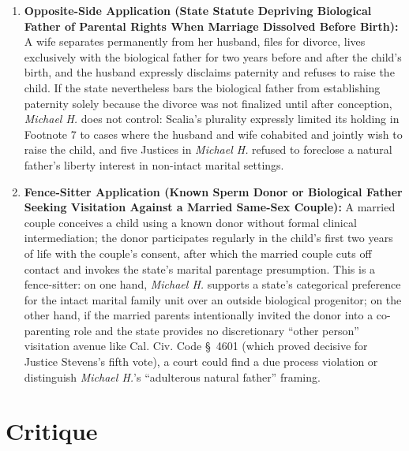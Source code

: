 \documentclass[12pt]{article}
\begin{document}
\begin{enumerate}
\item \textbf{Opposite-Side Application (State Statute Depriving Biological Father of Parental Rights When Marriage Dissolved Before Birth):} A wife separates permanently from her husband, files for divorce, lives exclusively with the biological father for two years before and after the child's birth, and the husband expressly disclaims paternity and refuses to raise the child. If the state nevertheless bars the biological father from establishing paternity solely because the divorce was not finalized until after conception, \textit{Michael H.} does not control: Scalia's plurality expressly limited its holding in Footnote 7 to cases where the husband and wife cohabited and jointly wish to raise the child, and five Justices in \textit{Michael H.} refused to foreclose a natural father's liberty interest in non-intact marital settings.

\item \textbf{Fence-Sitter Application (Known Sperm Donor or Biological Father Seeking Visitation Against a Married Same-Sex Couple):} A married couple conceives a child using a known donor without formal clinical intermediation; the donor participates regularly in the child's first two years of life with the couple's consent, after which the married couple cuts off contact and invokes the state's marital parentage presumption. This is a fence-sitter: on one hand, \textit{Michael H.} supports a state's categorical preference for the intact marital family unit over an outside biological progenitor; on the other hand, if the married parents intentionally invited the donor into a co-parenting role and the state provides no discretionary ``other person'' visitation avenue like Cal. Civ. Code \S~4601 (which proved decisive for Justice Stevens's fifth vote), a court could find a due process violation or distinguish \textit{Michael H.}'s ``adulterous natural father'' framing.
\end{enumerate}

\section{Critique}
\end{document}
